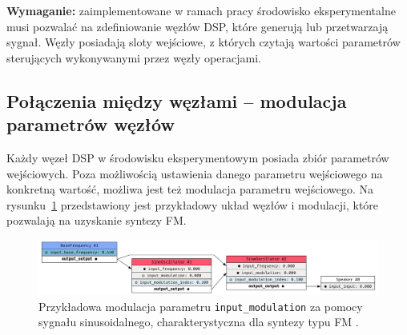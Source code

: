 \noindent
\textbf{Wymaganie:} zaimplementowane w ramach pracy środowisko eksperymentalne musi pozwalać na zdefiniowanie węzłów DSP, które generują lub
przetwarzają sygnał. Węzły posiadają sloty wejściowe, z których czytają wartości parametrów sterujących wykonywanymi 
przez węzły operacjami.

\subsection{Połączenia między węzłami -- modulacja parametrów węzłów}

Każdy węzeł DSP w środowisku eksperymentowym posiada zbiór parametrów wejściowych. Poza możliwością
ustawienia danego parametru wejściowego na konkretną wartość, możliwa jest też modulacja parametru
wejściowego. Na rysunku~\ref{fig:fm_mod_example} przedstawiony jest przykładowy układ węzłów i modulacji,
które pozwalają na uzyskanie syntezy FM.

\begin{figure}[H]
    \centering
    \includegraphics[width=1.0\linewidth]{rys02/fm_mod_example.png}
    \caption{
      Przykładowa modulacja parametru \texttt{input\_modulation} za pomocy sygnału sinusoidalnego, charakterystyczna dla syntezy typu FM \cite{computational_music_synthesis}.
    }
    \label{fig:fm_mod_example}
\end{figure}

